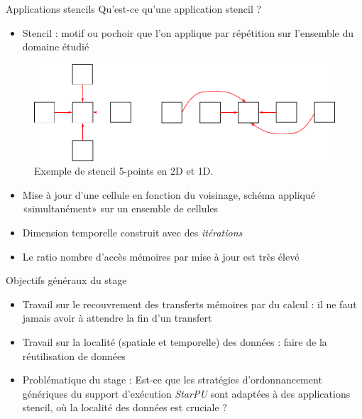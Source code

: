 \documentclass[9pt]{beamer}
\begin{document}
\begin{frame}{\textcolor{inriaGrey}{Applications stencils}}
  \vfill
  Qu'est-ce qu'une application stencil ?
  \vfill
  \begin{itemize}
    \item Stencil : motif ou pochoir que l'on applique par répétition sur
      l'ensemble du domaine étudié
  \end{itemize}
  \vfill
  \begin{figure}
    \centering
    \includegraphics[width=0.6\linewidth]{img/5-points-stencil.pdf}
    \caption{Exemple de stencil 5-points en 2D et 1D.}
  \end{figure}
  \vfill
  \begin{itemize}
  \item<2-> Mise à jour d'une cellule en fonction du voisinage, schéma appliqué
    «simultanément» sur un ensemble de cellules
  \vfill
  \item<3-> Dimension temporelle construit avec des \textit{itérations}
  \vfill
  \item<4-> Le ratio nombre d'accès mémoires par mise à jour est très élevé
  \end{itemize}
  \vfill
\end{frame}

\begin{frame}{\textcolor{inriaGrey}{Objectifs généraux du stage}}
  \vfill
  \begin{itemize}
  \item<1-> Travail sur le recouvrement des transferts mémoires par du calcul : il ne faut jamais
    avoir à attendre la fin d'un transfert \vfill
  \item<2-> Travail sur la localité (spatiale et temporelle) des données : faire
    de la réutilisation de données \vfill
  \item<3-> Problématique du stage : \newline Est-ce que les stratégies
    d'ordonnancement génériques du support d'exécution \textit{StarPU} sont
    adaptées à des applications stencil, où la localité des données est
    cruciale ?
  \end{itemize}
  \vfill
\end{frame}
\end{document}

